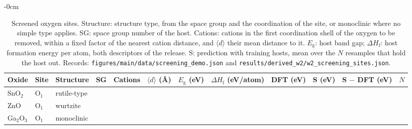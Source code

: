 \begin{table}[H]
\caption{Screened oxygen sites. Structure: structure type, from the space group and the coordination of the site, or monoclinic where no simple type applies. SG: space group number of the host. Cations: cations in the first coordination shell of the oxygen to be removed, within a fixed factor of the nearest cation distance, and $\langle d\rangle$ their mean distance to it. $E_\mathrm{g}$: host band gap; $\Delta H_\mathrm{f}$: host formation energy per atom, both descriptors of the release. S: prediction with \numNetScreenBudget{} training hosts, mean over the $N$ resamples that hold the host out. Records: \texttt{figures/main/data/screening\_demo.json} and \texttt{results/derived\_w2/w2\_screening\_sites.json}.\label{tab:app_screening}}
\begin{adjustwidth}{-\extralength}{0cm}
\centering
\small
\begin{tabular}{lllrrrrrrrrr}
\toprule
Oxide & Site & Structure & SG & Cations & $\langle d\rangle$ (\AA) & $E_\mathrm{g}$ (eV) & $\Delta H_\mathrm{f}$ (eV/atom) & DFT (eV) & S (eV) & S $-$ DFT (eV) & $N$ \\
\midrule
SnO$_2$ & O$_1$ & rutile-type & \numScreeningDemoHostsSnOTwoSpaceGroupNumber{} & \numScreeningDemoSitesSnOTwoVaOOneZeroFirstShellCations{} & \numScreeningDemoSitesSnOTwoVaOOneZeroFirstShellMeanDistanceA{} & \numScreeningDemoSitesSnOTwoVaOOneZeroBandGapEV{} & \numScreeningDemoSitesSnOTwoVaOOneZeroHostFormationEnergyEVPerAtom{} & \numNetScreenSnOTwoOOneDft{} & \numNetScreenSnOTwoOOnePred{} & \numNetScreenSnOTwoOOneErr{} & \numNetScreenSnOTwoOOneN{} \\
ZnO & O$_1$ & wurtzite & \numScreeningDemoHostsZnOSpaceGroupNumber{} & \numScreeningDemoSitesZnOVaOOneZeroFirstShellCations{} & \numScreeningDemoSitesZnOVaOOneZeroFirstShellMeanDistanceA{} & \numScreeningDemoSitesZnOVaOOneZeroBandGapEV{} & \numScreeningDemoSitesZnOVaOOneZeroHostFormationEnergyEVPerAtom{} & \numNetScreenZnOOOneDft{} & \numNetScreenZnOOOnePred{} & \numNetScreenZnOOOneErr{} & \numNetScreenZnOOOneN{} \\
Ga$_2$O$_3$ & O$_1$ & monoclinic & \numScreeningDemoHostsGaTwoOThreeSpaceGroupNumber{} & \numScreeningDemoSitesGaTwoOThreeVaOOneZeroFirstShellCations{} & \numScreeningDemoSitesGaTwoOThreeVaOOneZeroFirstShellMeanDistanceA{} & \numScreeningDemoSitesGaTwoOThreeVaOOneZeroBandGapEV{} & \numScreeningDemoSitesGaTwoOThreeVaOOneZeroHostFormationEnergyEVPerAtom{} & \numNetScreenGaTwoOThreeOOneDft{} & \numNetScreenGaTwoOThreeOOnePred{} & \numNetScreenGaTwoOThreeOOneErr{} & \numNetScreenGaTwoOThreeOOneN{} \\

\end{tabular}
\end{adjustwidth}
\end{table}
